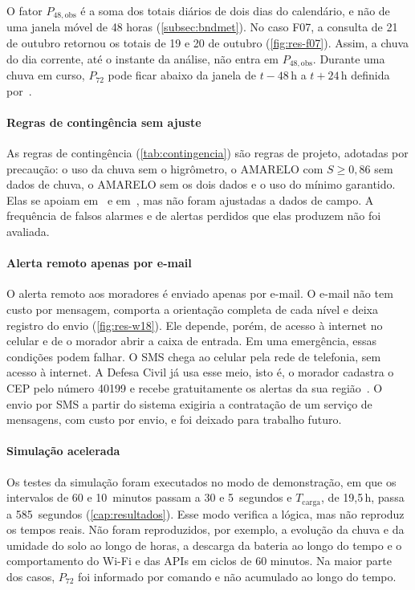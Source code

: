 O fator $P_{48,\mathrm{obs}}$ é a soma dos totais diários de dois dias do
calendário, e não de uma janela móvel de 48 horas
(\autoref{subsec:bndmet}). No caso F07, a consulta de 21 de outubro
retornou os totais de 19 e 20 de outubro (\autoref{fig:res-f07}).
Assim, a chuva do dia corrente, até o instante da análise, não entra em
$P_{48,\mathrm{obs}}$. Durante uma chuva em curso, $P_{72}$ pode ficar
abaixo da janela de $t-48$\,h a $t+24$\,h definida por~.

\paragraph*{Regras de contingência sem ajuste}

As regras de contingência (\autoref{tab:contingencia}) são regras de
projeto, adotadas por precaução: o uso da chuva sem o higrômetro, o
AMARELO com $S \geq 0{,}86$ sem dados de chuva, o AMARELO sem os dois
dados e o uso do mínimo garantido.
Elas se apoiam em~ e em~, mas não foram ajustadas a dados de campo. A
frequência de falsos alarmes e de alertas perdidos que elas produzem não
foi avaliada.

\paragraph*{Alerta remoto apenas por e-mail}

O alerta remoto aos moradores é enviado apenas por e-mail. O e-mail não
tem custo por mensagem, comporta a orientação completa de cada nível e
deixa registro do envio (\autoref{fig:res-w18}). Ele depende, porém, de
acesso à internet no celular e de o morador abrir a caixa de entrada.
Em uma emergência, essas condições podem falhar.
O SMS chega ao celular pela rede de telefonia, sem acesso à internet. A
Defesa Civil já usa esse meio, isto é, o morador cadastra o CEP pelo número
40199 e recebe gratuitamente os alertas da sua região~\cite{agenciaminas2023alertas}. O envio por SMS a partir do sistema
exigiria a contratação de um serviço de mensagens, com custo por envio,
e foi deixado para trabalho futuro.

\paragraph*{Simulação acelerada}

Os testes da simulação foram executados no modo de demonstração, em que
os intervalos de 60 e 10~minutos passam a 30 e 5~segundos e
$T_{\mathrm{carga}}$, de 19,5\,h, passa a 585~segundos
(\autoref{cap:resultados}). Esse modo verifica a lógica, mas não
reproduz os tempos reais.
Não foram reproduzidos, por exemplo, a evolução da chuva e da umidade do
solo ao longo de horas, a descarga da bateria ao longo do tempo e o
comportamento do Wi-Fi e das APIs em ciclos de 60 minutos. Na maior
parte dos casos, $P_{72}$ foi informado por comando e não acumulado ao
longo do tempo.
